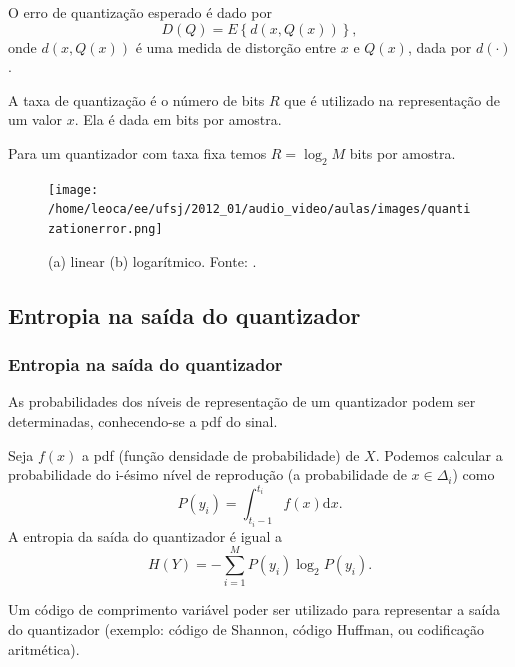 \begin{frame}[allowframebreaks]
  O erro de quantização esperado é dado por
  \begin{equation}
  D(Q) = E\left\lbrace d(x,Q(x)) \right\rbrace ,
  \end{equation}
  onde $d(x,Q(x))$ é uma medida de distorção entre $x$ e $Q(x)$, dada por $d(\cdot)$.

  A taxa de quantização é o número de bits $R$ que é utilizado na representação de um valor $x$.
  Ela é dada em bits por amostra.

  Para um quantizador com taxa fixa temos $R = \log_2 M$ bits por amostra.

  \framebreak

  \begin{figure}[h!]
  \centering
  \texttt{[image: /home/leoca/ee/ufsj/2012\_01/audio\_video/aulas/images/quantizationerror.png]}
  \caption{(a) linear (b) logarítmico. Fonte: \cite{oppenheim2009}.}
  \label{fig:quantizationerror}
  \end{figure}  

\end{frame}

\subsection{Entropia na saída do quantizador}
\begin{frame}[allowframebreaks]
  \frametitle{Entropia na saída do quantizador}
  As probabilidades dos níveis de representação de um quantizador podem ser determinadas,
  conhecendo-se a pdf do sinal.

  Seja $f(x)$ a pdf (função densidade de probabilidade) de $X$. Podemos calcular a probabilidade
  do i-ésimo nível de reprodução (a probabilidade de $x \in \Delta_i$) como
  \begin{equation}
  P(y_i) = \int_{t_i -1}^{t_i} f(x) \mathrm{d}x .
  \end{equation}
  A entropia da saída do quantizador é igual a
  \begin{equation}
  H(Y) = - \sum_{i=1}^{M} P(y_i) \log_2 P(y_i) .
  \end{equation}

  Um código de comprimento variável poder ser utilizado para representar a saída 
  do quantizador (exemplo: código de Shannon, código Huffman, ou codificação aritmética).
\end{frame}


